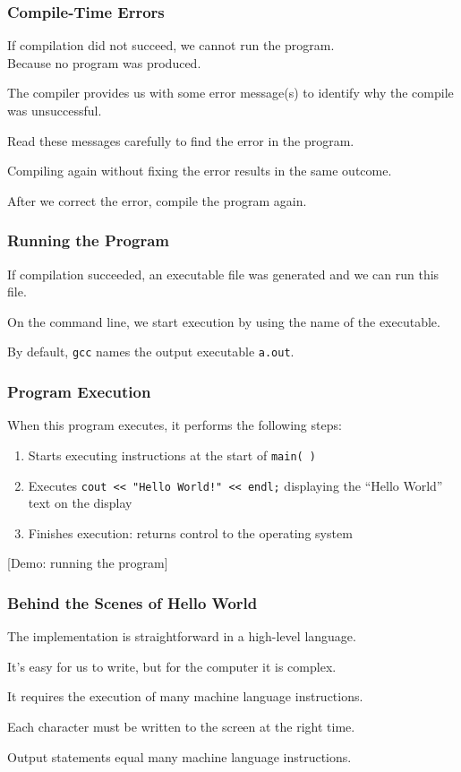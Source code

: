 \begin{frame}
\frametitle{Compile-Time Errors}

If compilation did not succeed, we cannot run the program.\\
\quad Because no program was produced.

The compiler provides us with some error message(s) to identify why the compile was unsuccessful.

Read these messages carefully to find the error in the program.

Compiling again without fixing the error results in the same outcome.

After we correct the error, compile the program again.

\end{frame}

\begin{frame}
\frametitle{Running the Program} 
If compilation succeeded, an executable file was generated and we can run this file.

On the command line, we start execution by using the name of the executable.


By default, \texttt{gcc} names the output executable \texttt{a.out}.

\end{frame}

\begin{frame}
\frametitle{Program Execution}

When this program executes, it performs the following steps:

\begin{enumerate}
	\item Starts executing instructions at the start of \texttt{main( )}
	\item Executes \texttt{cout << "Hello World!" << endl;} displaying the ``Hello World'' text on the display
	\item Finishes execution: returns control to the operating system
\end{enumerate}

[Demo: running the program]

\end{frame}

\begin{frame}
\frametitle{Behind the Scenes of Hello World}

The implementation is straightforward in a high-level language.

It's easy for us to write, but for the computer it is complex.

It requires the execution of many machine language instructions.

Each character must be written to the screen at the right time.

Output statements equal many machine language instructions.

\end{frame}


